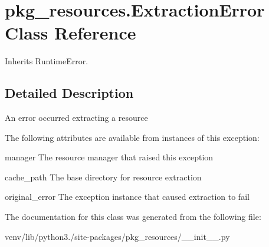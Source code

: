 \hypertarget{classpkg__resources_1_1_extraction_error}{}\section{pkg\+\_\+resources.\+Extraction\+Error Class Reference}
\label{classpkg__resources_1_1_extraction_error}


Inherits Runtime\+Error.



\subsection{Detailed Description}
\begin{DoxyVerb}An error occurred extracting a resource

The following attributes are available from instances of this exception:

manager
    The resource manager that raised this exception

cache_path
    The base directory for resource extraction

original_error
    The exception instance that caused extraction to fail
\end{DoxyVerb}
 

The documentation for this class was generated from the following file\+:\begin{DoxyCompactItemize}
\item 
venv/lib/python3./site-\/packages/pkg\+\_\+resources/\+\_\+\+\_\+init\+\_\+\+\_\+.\+py\end{DoxyCompactItemize}
